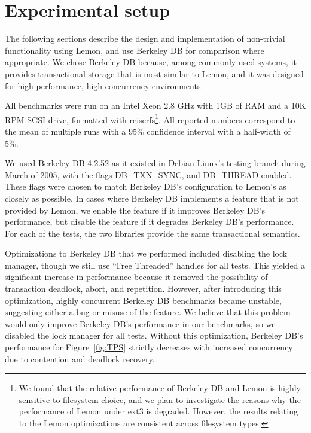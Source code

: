 \documentclass[10pt,letterpaper,twocolumn,english]{article}
\newcommand{\yad}{Lemon\xspace}
\newcommand{\oasys}{Juicer\xspace}
\begin{document}









\section{Experimental setup}
\label{sec:experimental_setup}

The following sections describe the design and implementation of
non-trivial functionality using \yad, and use Berkeley DB for
comparison where appropriate.  We chose Berkeley DB because, among
commonly used systems, it provides transactional storage that is most
similar to \yad, and it was
designed for high-performance, high-concurrency environments.

All benchmarks were run on an Intel Xeon 2.8 GHz with 1GB of RAM and a
10K RPM SCSI drive, formatted with reiserfs\footnote{We found that the
relative performance of Berkeley DB and \yad is highly sensitive to
filesystem choice, and we plan to investigate the reasons why the
performance of \yad under ext3 is degraded. However, the results
relating to the \yad optimizations are consistent across filesystem
types.}.  All reported numbers correspond to the mean of multiple runs
with a 95\% confidence interval with a half-width of 5\%.

We used Berkeley DB 4.2.52 as it existed in Debian Linux's testing
branch during March of 2005, with the flags DB\_TXN\_SYNC, and DB\_THREAD
enabled. These flags were chosen to match 
Berkeley DB's configuration to \yad's as closely as possible.  In cases where
Berkeley DB implements a feature that is not provided by \yad, we
enable the feature if it improves Berkeley DB's performance, but
disable the feature if it degrades Berkeley DB's performance.
For each of the tests, the two libraries provide the same transactional semantics.

Optimizations to Berkeley DB that we performed included disabling the
lock manager, though we still use ``Free Threaded'' handles for all
tests.  This yielded a significant increase in performance because it
removed the possibility of transaction deadlock, abort, and repetition.
However, after introducing this optimization, highly concurrent
Berkeley DB benchmarks became unstable, suggesting either a bug or
misuse of the feature.  We believe that this problem would only
improve Berkeley DB's performance in our benchmarks, so we disabled
the lock manager for all tests.  Without this optimization, Berkeley
DB's performance for Figure~\ref{fig:TPS} strictly decreases with increased concurrency due to contention and deadlock recovery.
\end{document}
